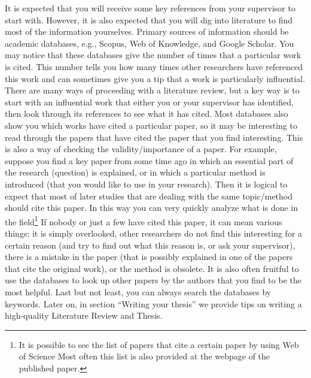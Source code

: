 \documentclass{article}
\begin{document}
It is expected that you will receive some key references from your supervisor to start with. However, it is also expected that you will dig into literature to find most of the information yourselves. Primary sources of information should be academic databases, e.g., Scopus, Web of Knowledge, and Google Scholar. You may notice that these databases give the number of times that a particular work is cited. This number tells you how many times other researchers have referenced this work and can sometimes give you a tip that a work is particularly influential. There are many ways of proceeding with a literature review, but a key way is to start with an influential work that either you or your supervisor has identified, then look through its references to see what it has cited. Most databases also show you which works have cited a particular paper, so it may be interesting to read through the papers that have cited the paper that you find interesting. This is also a way of checking the validity/importance of a paper. For example, suppose you find a key paper from some time ago in which an essential part of the research (question) is explained, or in which a particular method is introduced (that you would like to use in your research). Then it is logical to expect that most of later studies that are dealing with the same topic/method should cite this paper. In this way you can very quickly analyze what is done in the field\footnote{It is possible to see the list of papers that cite a certain paper by using Web of Science
Most often this list is also provided at the webpage of the published paper.} 
If nobody or just a few have cited this paper, it can mean various things: it is simply overlooked, other researchers do not find this interesting for a certain reason (and try to find out what this reason is, or ask your supervisor), there is a mistake in the paper (that is possibly explained in one of the papers that cite the original work), or the method is obsolete. It is also often fruitful to use the databases to look up other papers by the authors that you find to be the most helpful.  Last but not least, you can always search the databases by keywords. Later on, in section “Writing your thesis” we provide tips on writing a high-quality Literature Review and Thesis. 
\end{document}
